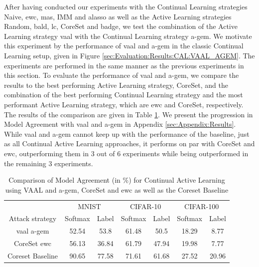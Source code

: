 After having conducted our experiments with the Continual Learning strategies Naive, \gls{ewc}, \gls{mas}, IMM and \gls{alasso} as well as the Active Learning strategies
Random, \gls{bald}, \gls{lc}, CoreSet and \gls{badge}, we test the combination of the Active Learning strategy \gls{vaal} with the Continual Learning strategy \gls{a-gem}. We motivate
this experiment by the performance of \gls{vaal} and \gls{a-gem} in the classic Continual Learning setup, given in Figure \ref{sec:Evaluation:Results:CAL:VAAL_AGEM}.
The experiments are performed in the same manner as the previous experiments in this section. To evaluate the performance of \gls{vaal} and \gls{a-gem}, we compare
the results to the best performing Active Learning strategy, CoreSet, and the combination of the best performing Continual Learning strategy and the
most performant Active Learning strategy, which are \gls{ewc} and CoreSet, respectively. The results of the comparison are given in Table 
\ref{fig:ModelStealingVAAL_AGEM}. We present the progression in Model Agreement with \gls{vaal} and \gls{a-gem} in Appendix \ref{sec:Appendix:Results}. While \gls{vaal}
and \gls{a-gem} cannot keep up with the performance of the baseline, just as all Continual Active Learning approaches, it performs on par with CoreSet and \gls{ewc},
outperforming them in 3 out of 6 experiments while being outperformed in the remaining 3 experiments. \par
\begin{table}[h]
    \centering
    \begin{tabular}{c c c c c c c} 
        \hline
        & \multicolumn{2}{c}{MNIST} & \multicolumn{2}{c}{CIFAR-10} & \multicolumn{2}{c}{CIFAR-100} \\ 
        \cline{2-7} Attack strategy & Softmax & Label & Softmax & Label & Softmax & Label \\
        \hline 
        \gls{vaal} \gls{a-gem} & 52.54 & 53.8 & 61.48 & 50.5 & 18.29 & 8.77\\
        CoreSet \gls{ewc} & 56.13 & 36.84 & 61.79 & 47.94 & 19.98 & 7.77 \\
        Coreset Baseline & 90.65 & 77.58 & 71.61 & 61.68 & 27.52 & 20.96\\
        \hline
    \end{tabular}
    \caption{Comparison of Model Agreement (in \%) for Continual Active Learning using VAAL and \gls{a-gem}, CoreSet and \gls{ewc} as well as the Coreset Baseline}
    \label{fig:ModelStealingVAAL_AGEM}
\end{table}

